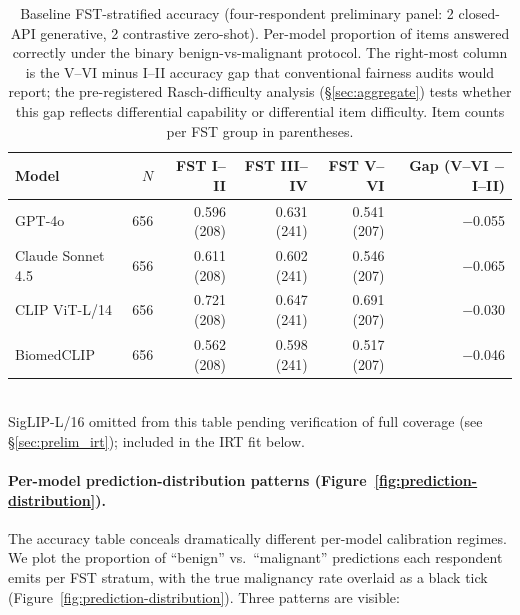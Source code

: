 \documentclass{article}
\begin{document}
\begin{table}[t]
\centering
\caption{Baseline FST-stratified accuracy (four-respondent preliminary panel: 2 closed-API generative, 2 contrastive zero-shot). Per-model proportion of items answered correctly under the binary benign-vs-malignant protocol. The right-most column is the V--VI minus I--II accuracy gap that conventional fairness audits would report; the pre-registered Rasch-difficulty analysis (\S\ref{sec:aggregate}) tests whether this gap reflects differential capability or differential item difficulty. Item counts per FST group in parentheses.}
\label{tab:prelim-fst-accuracy}
\small
\begin{tabular}{lrrrrr}
\toprule
Model & $N$ & FST I--II & FST III--IV & FST V--VI & Gap (V--VI $-$ I--II) \\
\midrule
GPT-4o            & 656 & 0.596 (208) & 0.631 (241) & 0.541 (207) & $-$0.055 \\
Claude Sonnet 4.5 & 656 & 0.611 (208) & 0.602 (241) & 0.546 (207) & $-$0.065 \\
CLIP ViT-L/14     & 656 & 0.721 (208) & 0.647 (241) & 0.691 (207) & $-$0.030 \\
BiomedCLIP        & 656 & 0.562 (208) & 0.598 (241) & 0.517 (207) & $-$0.046 \\
\bottomrule
\end{tabular}
\\[0.3ex]
{\footnotesize SigLIP-L/16 omitted from this table pending verification of full coverage (see \S\ref{sec:prelim_irt}); included in the IRT fit below.}
\normalsize
\end{table}

\paragraph{Per-model prediction-distribution patterns (Figure~\ref{fig:prediction-distribution}).}
\label{sec:prelim_calibration}
The accuracy table conceals dramatically different per-model calibration regimes. We plot the proportion of ``benign'' vs.\ ``malignant'' predictions each respondent emits per FST stratum, with the true malignancy rate overlaid as a black tick (Figure~\ref{fig:prediction-distribution}). Three patterns are visible:
\end{document}

